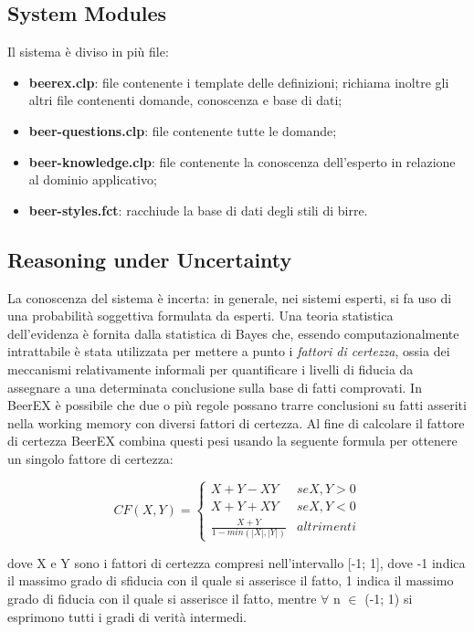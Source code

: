 \documentclass[12pt]{article}
\begin{document}
\subsection{System Modules}

Il sistema è diviso in più file:
\begin{itemize}
\item \textbf{beerex.clp}: file contenente i template delle definizioni; richiama inoltre gli altri file contenenti domande, conoscenza e base di dati;
\item \textbf{beer-questions.clp}: file contenente tutte le domande;
\item \textbf{beer-knowledge.clp}: file contenente la conoscenza dell’esperto in relazione al dominio applicativo;
\item \textbf{beer-styles.fct}: racchiude la base di dati degli stili di birre.
\end{itemize}

\subsection{Reasoning under Uncertainty}

La conoscenza del sistema è incerta: in generale, nei sistemi esperti, si fa uso di una probabilità soggettiva formulata da esperti. Una teoria statistica dell'evidenza è fornita dalla statistica di Bayes che, essendo computazionalmente intrattabile è stata utilizzata per mettere a punto i \textit{fattori di certezza}, ossia dei meccanismi relativamente informali per quantificare i livelli di fiducia da assegnare a una determinata conclusione sulla base di fatti comprovati. In BeerEX è possibile che due o più regole possano trarre conclusioni su fatti asseriti nella working memory con diversi fattori di certezza. Al fine di calcolare il fattore di certezza BeerEX combina questi pesi usando la seguente formula per ottenere un singolo fattore di certezza:

\[
   CF(X,Y) =
   \begin{cases}
      X+Y-XY & se X,Y > 0 \\
      X+Y+XY & se X,Y < 0 \\
      \frac{X+Y}{1-min(|X|,|Y|)} & altrimenti
   \end{cases}
\]

dove X e Y sono i fattori di certezza compresi nell'intervallo [-1; 1], dove -1 indica il massimo grado di sfiducia con il quale si asserisce il fatto, 1 indica il massimo grado di fiducia con il quale si asserisce il fatto, mentre $\forall$ n $\in$ (-1; 1) si esprimono tutti i gradi di verità intermedi.
\end{document}
